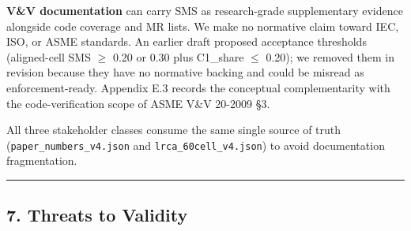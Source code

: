 \documentclass[review,12pt,authoryear]{elsarticle}
\begin{document}
\textbf{V\&V documentation} can carry SMS as research-grade
supplementary evidence alongside code coverage and MR lists. We make no
normative claim toward IEC, ISO, or ASME standards. An earlier draft
proposed acceptance thresholds (aligned-cell SMS $\geq$ 0.20 or 0.30 plus
C1\_share $\leq$ 0.20); we removed them in revision because they have no
normative backing and could be misread as enforcement-ready. Appendix
E.3 records the conceptual complementarity with the code-verification
scope of ASME V\&V 20-2009 §3.

All three stakeholder classes consume the same single source of truth
(\texttt{paper\_numbers\_v4.json} and \texttt{lrca\_60cell\_v4.json}) to
avoid documentation fragmentation.

\begin{center}\rule{0.5\linewidth}{0.5pt}\end{center}

\subsection{7. Threats to Validity}\label{threats-to-validity}
\end{document}
